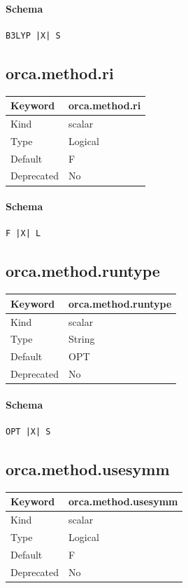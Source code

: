 \documentclass[11pt]{article}
\begin{document}
{{{{{\paragraph{Schema}
\begin{Verbatim}
B3LYP |X| S
\end{Verbatim}

\subsection{orca.method.ri}
\label{kw:orca-method-ri}
\begin{longtable}{|p{1.5in}|p{4.5in}|}
\hline
Keyword & orca.method.ri \\
\hline
Kind & scalar \\
\hline
Type & Logical \\
\hline
Default & F \\
\hline
Deprecated & No \\
\hline
\end{longtable}
\paragraph{Schema}
\begin{Verbatim}
F |X| L
\end{Verbatim}

\subsection{orca.method.runtype}
\label{kw:orca-method-runtype}
\begin{longtable}{|p{1.5in}|p{4.5in}|}
\hline
Keyword & orca.method.runtype \\
\hline
Kind & scalar \\
\hline
Type & String \\
\hline
Default & OPT \\
\hline
Deprecated & No \\
\hline
\end{longtable}
\paragraph{Schema}
\begin{Verbatim}
OPT |X| S
\end{Verbatim}

\subsection{orca.method.usesymm}
\label{kw:orca-method-usesymm}
\begin{longtable}{|p{1.5in}|p{4.5in}|}
\hline
Keyword & orca.method.usesymm \\
\hline
Kind & scalar \\
\hline
Type & Logical \\
\hline
Default & F \\
\hline
Deprecated & No \\
\hline
\end{longtable}
}}}}}
\end{document}
